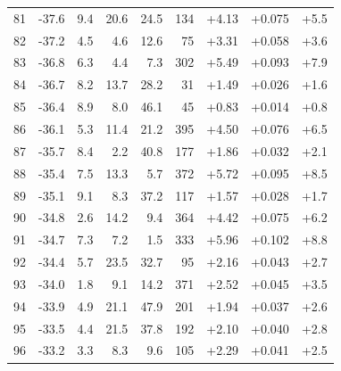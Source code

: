 \begin{longtable}{@{}r r r r r r r r r@{}}
81 & -37.6 & 9.4 & 20.6 & 24.5 & 134 & \cellcolor{green!48}+4.13 & \cellcolor{yellow!51}+0.075 & \cellcolor{orange!41}+5.5 \\
82 & -37.2 & 4.5 & 4.6 & 12.6 & 75 & \cellcolor{green!41}+3.31 & \cellcolor{yellow!42}+0.058 & \cellcolor{orange!32}+3.6 \\
83 & -36.8 & 6.3 & 4.4 & 7.3 & 302 & \cellcolor{green!58}+5.49 & \cellcolor{yellow!60}+0.093 & \cellcolor{orange!53}+7.9 \\
84 & -36.7 & 8.2 & 13.7 & 28.2 & 31 & \cellcolor{green!27}+1.49 & \cellcolor{yellow!27}+0.026 & \cellcolor{orange!23}+1.6 \\
85 & -36.4 & 8.9 & 8.0 & 46.1 & 45 & \cellcolor{green!22}+0.83 & \cellcolor{yellow!21}+0.014 & \cellcolor{orange!19}+0.8 \\
86 & -36.1 & 5.3 & 11.4 & 21.2 & 395 & \cellcolor{green!51}+4.50 & \cellcolor{yellow!51}+0.076 & \cellcolor{orange!46}+6.5 \\
87 & -35.7 & 8.4 & 2.2 & 40.8 & 177 & \cellcolor{green!30}+1.86 & \cellcolor{yellow!30}+0.032 & \cellcolor{orange!25}+2.1 \\
88 & -35.4 & 7.5 & 13.3 & 5.7 & 372 & \cellcolor{green!60}+5.72 & \cellcolor{yellow!61}+0.095 & \cellcolor{orange!56}+8.5 \\
89 & -35.1 & 9.1 & 8.3 & 37.2 & 117 & \cellcolor{green!28}+1.57 & \cellcolor{yellow!28}+0.028 & \cellcolor{orange!23}+1.7 \\
90 & -34.8 & 2.6 & 14.2 & 9.4 & 364 & \cellcolor{green!50}+4.42 & \cellcolor{yellow!51}+0.075 & \cellcolor{orange!45}+6.2 \\
91 & -34.7 & 7.3 & 7.2 & 1.5 & 333 & \cellcolor{green!62}+5.96 & \cellcolor{yellow!64}+0.102 & \cellcolor{orange!57}+8.8 \\
92 & -34.4 & 5.7 & 23.5 & 32.7 & 95 & \cellcolor{green!32}+2.16 & \cellcolor{yellow!35}+0.043 & \cellcolor{orange!28}+2.7 \\
93 & -34.0 & 1.8 & 9.1 & 14.2 & 371 & \cellcolor{green!35}+2.52 & \cellcolor{yellow!36}+0.045 & \cellcolor{orange!32}+3.5 \\
94 & -33.9 & 4.9 & 21.1 & 47.9 & 201 & \cellcolor{green!31}+1.94 & \cellcolor{yellow!32}+0.037 & \cellcolor{orange!27}+2.6 \\
95 & -33.5 & 4.4 & 21.5 & 37.8 & 192 & \cellcolor{green!32}+2.10 & \cellcolor{yellow!33}+0.040 & \cellcolor{orange!28}+2.8 \\
96 & -33.2 & 3.3 & 8.3 & 9.6 & 105 & \cellcolor{green!33}+2.29 & \cellcolor{yellow!34}+0.041 & \cellcolor{orange!27}+2.5 \\

\end{longtable}
